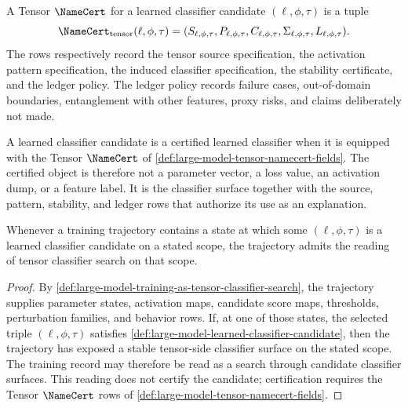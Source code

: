 \begin{definition}
\label{def:large-model-tensor-namecert-fields}
A Tensor $\NameCert$ for a learned classifier candidate
$(\ell,\phi,\tau)$ is a tuple
$$
\NameCert_{\mathrm{tensor}}(\ell,\phi,\tau)
=
(S_{\ell,\phi,\tau},
P_{\ell,\phi,\tau},
C_{\ell,\phi,\tau},
\Sigma_{\ell,\phi,\tau},
L_{\ell,\phi,\tau}).
$$
The rows respectively record the tensor source specification, the
activation pattern specification, the induced classifier specification,
the stability certificate, and the ledger policy. The ledger policy
records failure cases, out-of-domain boundaries, entanglement with other
features, proxy risks, and claims deliberately not made.
\end{definition}

\begin{definition}
\label{def:large-model-certified-learned-classifier}
A learned classifier candidate is a certified learned classifier when it
is equipped with the Tensor $\NameCert$ of
\autoref{def:large-model-tensor-namecert-fields}. The certified object is
therefore not a parameter vector, a loss value, an activation dump, or a
feature label. It is the classifier surface together with the source,
pattern, stability, and ledger rows that authorize its use as an
explanation.
\end{definition}

\begin{theorem}
\label{thm:large-model-training-tensor-classifier-search}
Whenever a training trajectory contains a state at which some
$(\ell,\phi,\tau)$ is a learned classifier candidate on a stated scope,
the trajectory admits the reading of tensor classifier search on that
scope.
\end{theorem}

\begin{proof}
By \autoref{def:large-model-training-as-tensor-classifier-search}, the
trajectory supplies parameter states, activation maps, candidate score
maps, thresholds, perturbation families, and behavior rows. If, at one of
those states, the selected triple $(\ell,\phi,\tau)$ satisfies
\autoref{def:large-model-learned-classifier-candidate}, then the
trajectory has exposed a stable tensor-side classifier surface on the
stated scope. The training record may therefore be read as a search
through candidate classifier surfaces. This reading does not certify the
candidate; certification requires the Tensor $\NameCert$ rows of
\autoref{def:large-model-tensor-namecert-fields}.
\end{proof}

